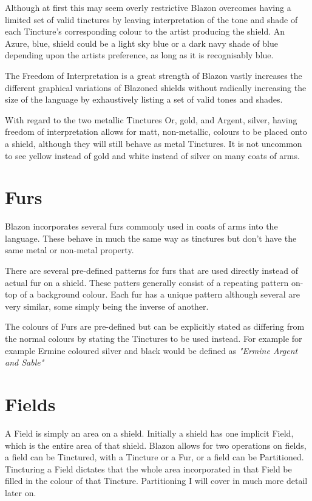Although at first this may seem overly restrictive Blazon overcomes having a limited set of valid tinctures by leaving interpretation of the tone and shade of each Tincture's corresponding colour to the artist producing the shield. 
An Azure, blue, shield could be a light sky blue or a dark navy shade of blue depending upon the artists preference, as long as it is recognisably blue. 

The Freedom of Interpretation is a great strength of Blazon vastly increases the different graphical variations of Blazoned shields without radically increasing the size of the language by exhaustively listing a set of valid tones and shades. 

With regard to the two metallic Tinctures Or, gold, and Argent, silver, having freedom of interpretation allows for matt, non-metallic, colours to be placed onto a shield, although they will still behave as metal Tinctures.  It is not uncommon to see yellow instead of gold and white instead of silver on many coats of arms.


\section{Furs}

Blazon incorporates several furs commonly used in coats of arms into the language.  These behave in much the same way as tinctures but don't have the same metal or non-metal property.

There are several pre-defined patterns for furs that are used directly instead of actual fur on a shield.  These patters generally consist of a repeating pattern on-top of a background colour.  Each fur has a unique pattern although several are very similar, some simply being the inverse of another.

The colours of Furs are pre-defined but can be explicitly stated as differing from the normal colours  by stating the Tinctures to be used instead.  For example for example Ermine coloured silver and black would be defined as \emph{"Ermine Argent and Sable"} 


\section{Fields}
A Field is simply an area on a shield.  Initially a shield has one implicit Field, which is the entire area of that shield.  Blazon allows for two operations on fields, a field can be Tinctured, with a Tincture or a Fur, or a field can be Partitioned. 
Tincturing a Field dictates that the whole area incorporated in that Field be filled in the colour of that Tincture.  Partitioning I will cover in much more detail later on.


